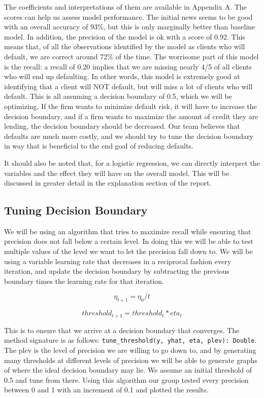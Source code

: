 \documentclass[12pt]{article}
\begin{document}
	The coefficients and interpretations of them are available in Appendix A. The scores can help us assess model performance. The initial news seems to be good with an overall accuracy of 93\%, but this is only marginally better than baseline model. In addition, the precision of the model is ok with a score of 0.92. This means that, of all the observations identified by the model as clients who will default, we are correct around 72\% of the time. The worrisome part of this model is the recall: a recall of 0.20 implies that we are missing nearly 4/5 of all clients who will end up defaulting. In other words, this model is extremely good at identifying that a client will NOT default, but will miss a lot of clients who will default. This is all assuming a decision boundary of 0.5, which we will be optimizing. If the firm wants to minimize default risk, it will have to increase the decision boundary, and if a firm wants to maximize the amount of credit they are lending, the decision boundary should be decreased. Our team believes that defaults are much more costly, and we should try to tune the decision boundary in  way that is beneficial to the end goal of reducing defaults. 
	
	It should also be noted that, for a logistic regression, we can directly interpret the variables and the effect they will have on the overall model. This will be discussed in greater detail in the explanation section of the report.

	\subsection{Tuning Decision Boundary}
	
	We will be using an algorithm that tries to maximize recall while ensuring that precision does not fall below a certain level. In doing this we will be able to test multiple values of the level we want to let the precision fall down to. We will be using a variable learning rate that decreases in a reciprocal fashion every iteration, and update the decision boundary by subtracting the previous boundary times the learning rate for that iteration. 
	
	$$ \eta_{t+1} = \eta_0/t $$ 
	
	$$ threshold_{t+1} = threshold_t*eta_t $$
	
	This is to ensure that we arrive at a decision boundary that converges. The method signature is as follows: \verb|tune_threshold(y, yhat, eta, plev): Double|. The plev is the level of precision we are willing to go down to, and by generating many thresholds at different levels of precision we will be able to generate graphs of where the ideal decision boundary may lie. We assume an initial threshold of 0.5 and tune from there. Using this algorithm our group tested every precision between 0 and 1 with an increment of 0.1 and plotted the results. 
	
\end{document}
